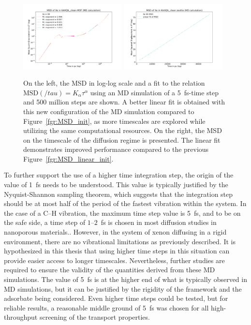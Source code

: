 \documentclass[main]{subfiles}
\begin{document}
\begin{figure}[ht]
  \centering
  \includegraphics[width=0.48\textwidth]{figures/5-diffusion/MSD_Xe_KAXQIL_clean_5fs.pdf}
  \includegraphics[width=0.48\textwidth]{figures/5-diffusion/MSD_Xe_coeff_KAXQIL_clean_5fs.pdf}
\caption{ On the left, the MSD in log-log scale and a fit to the relation $\text{MSD}(/tau) = K_\alpha\tau^\alpha$ using an MD simulation of a \SI{5}{\fs}-time step and 500 million steps are shown. A better linear fit is obtained with this new configuration of the MD simulation compared to Figure~\ref{fgr:MSD_init}, as more timescales are explored while utilizing the same computational resources. On the right, the MSD on the timescale of the diffusion regime is presented. The linear fit demonstrates improved performance compared to the previous Figure~\ref{fgr:MSD_linear_init}.}\label{fgr:MSD_5fs}
\end{figure}

To further support the use of a higher time integration step, the origin of the value of \SI{1}{\fs} needs to be understood. This value is typically justified by the Nyquist-Shannon sampling theorem, which suggests that the integration step should be at most half of the period of the fastest vibration within the system. In the case of a C--H vibration, the maximum time step value is \SI{5}{\fs}, and to be on the safe side, a time step of $1$--$2$~\si{\fs} is chosen in most diffusion studies in nanoporous materials.\autocite{Bukowski_2021}. However, in the system of xenon diffusing in a rigid environment, there are no vibrational limitations as previously described. It is hypothesized in this thesis that using higher time steps in this situation can provide easier access to longer timescales. Nevertheless, further studies are required to ensure the validity of the quantities derived from these MD simulations. The value of \SI{5}{\fs} is at the higher end of what is typically observed in MD simulations, but it can be justified by the rigidity of the framework and the adsorbate being considered. Even higher time steps could be tested, but for reliable results, a reasonable middle ground of \SI{5}{\fs} was chosen for all high-throughput screening of the transport properties.
\end{document}
